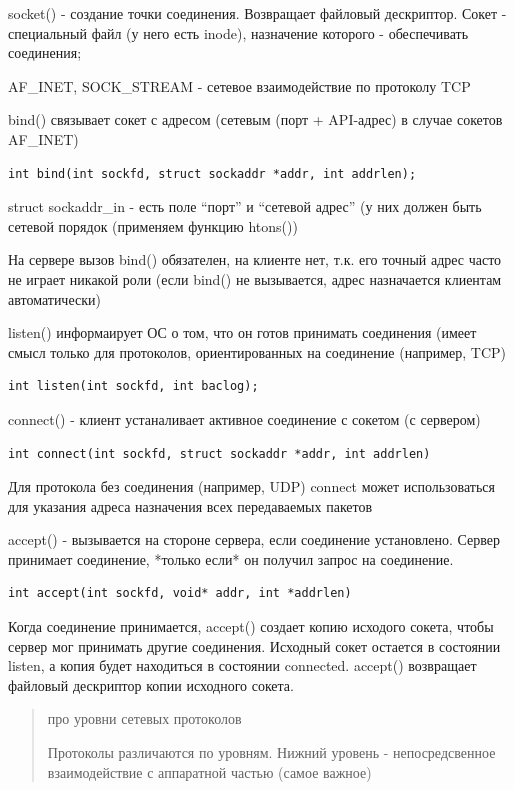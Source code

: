 socket() - создание точки соединения. Возвращает файловый дескриптор. Сокет - специальный файл (у него есть inode), назначение которого - обеспечивать соединения;

AF\_INET, SOCK\_STREAM - сетевое взаимодействие по протоколу TCP

bind() связывает сокет с адресом (сетевым (порт + API-адрес) в случае сокетов AF\_INET)

\begin{lstlisting}
int bind(int sockfd, struct sockaddr *addr, int addrlen);
\end{lstlisting}

struct sockaddr\_in - есть поле “порт” и “сетевой адрес” (у них должен быть сетевой порядок (применяем функцию htons())

На сервере вызов bind() обязателен, на клиенте нет, т.к. его точный адрес часто не играет никакой роли (если bind() не вызывается, адрес назначается клиентам автоматически)

listen() информаирует ОС о том, что он готов принимать соединения (имеет смысл только для протоколов, ориентированных на соединение (например, TCP)

\begin{lstlisting}
int listen(int sockfd, int baclog);
\end{lstlisting}
connect() - клиент устаналивает активное соединение с сокетом (с сервером)
\begin{lstlisting}
int connect(int sockfd, struct sockaddr *addr, int addrlen)
\end{lstlisting}

Для протокола без соединения (например, UDP) connect может использоваться для указания адреса назначения всех передаваемых пакетов

accept() - вызывается на стороне сервера, если соединение установлено. Сервер принимает соединение, *только если* он получил запрос на соединение.

\begin{lstlisting}
int accept(int sockfd, void* addr, int *addrlen)
\end{lstlisting}

Когда соединение принимается, accept()  создает копию исходого сокета, чтобы сервер мог принимать другие соединения. Исходный сокет остается в состоянии listen, а копия будет находиться в состоянии connected. accept() возвращает файловый дескриптор копии исходного сокета.

\begin{quote}
про уровни сетевых протоколов

Протоколы различаются по уровням. Нижний уровень - непосредсвенное взаимодействие с аппаратной частью (самое важное)
\end{quote}

